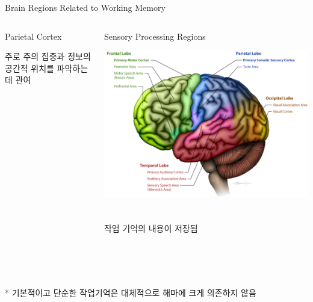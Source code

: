 \documentclass{beamer}
\begin{document}
\begin{frame}{Brain Regions Related to Working Memory}
\begin{columns}
\begin{column}{0.31\textwidth}
\begin{block}{Parietal Cortex}
\begin{minipage}[t][5cm][c]{\textwidth}
          주로 주의 집중과 정보의 공간적 위치를 파악하는 데 관여
        \end{minipage}
      \end{block}
    \end{column}
    \hfill
    \begin{column}{0.31\textwidth}
      \begin{block}{Sensory Processing Regions}
        \begin{minipage}[t][5cm][c]{\textwidth}
          \centering
          \includegraphics[width=\textwidth]{image/working_memory_b3}\\~\\~\\
          작업 기억의 내용이 저장됨
        \end{minipage}
      \end{block}
    \end{column}
  \end{columns}\\~\\~\\
  \large ** 기본적이고 단순한 작업기억은 대체적으로 해마에 크게 의존하지 않음
\end{frame}
\end{document}
